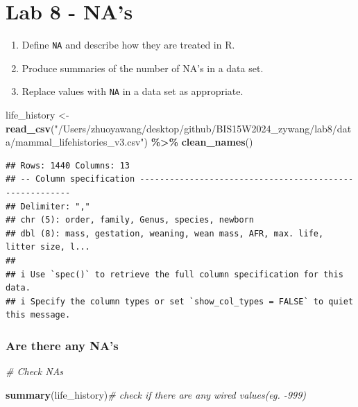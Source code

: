 \documentclass[
]{article}
\newenvironment{Shaded}{\begin{snugshade}}{\end{snugshade}}
\newcommand{\CommentTok}[1]{\textcolor[rgb]{0.56,0.35,0.01}{\textit{#1}}}
\newcommand{\FunctionTok}[1]{\textcolor[rgb]{0.13,0.29,0.53}{\textbf{#1}}}
\newcommand{\NormalTok}[1]{#1}
\newcommand{\OtherTok}[1]{\textcolor[rgb]{0.56,0.35,0.01}{#1}}
\newcommand{\SpecialCharTok}[1]{\textcolor[rgb]{0.81,0.36,0.00}{\textbf{#1}}}
\newcommand{\StringTok}[1]{\textcolor[rgb]{0.31,0.60,0.02}{#1}}
\providecommand{\tightlist}{%
  \setlength{\itemsep}{0pt}\setlength{\parskip}{0pt}}
\begin{document}
\hypertarget{lab-8---nas}{%
\section{Lab 8 - NA's}\label{lab-8---nas}}

\begin{enumerate}
\def\labelenumi{\arabic{enumi}.}
\tightlist
\item
  Define \texttt{NA} and describe how they are treated in R.\\
\item
  Produce summaries of the number of NA's in a data set.\\
\item
  Replace values with \texttt{NA} in a data set as appropriate.
\end{enumerate}

\begin{Shaded}
\begin{Highlighting}[]
\NormalTok{life\_history }\OtherTok{\textless{}{-}} \FunctionTok{read\_csv}\NormalTok{(}\StringTok{"/Users/zhuoyawang/desktop/github/BIS15W2024\_zywang/lab8/data/mammal\_lifehistories\_v3.csv"}\NormalTok{) }\SpecialCharTok{\%\textgreater{}\%} \FunctionTok{clean\_names}\NormalTok{()}
\end{Highlighting}
\end{Shaded}

\begin{verbatim}
## Rows: 1440 Columns: 13
## -- Column specification --------------------------------------------------------
## Delimiter: ","
## chr (5): order, family, Genus, species, newborn
## dbl (8): mass, gestation, weaning, wean mass, AFR, max. life, litter size, l...
## 
## i Use `spec()` to retrieve the full column specification for this data.
## i Specify the column types or set `show_col_types = FALSE` to quiet this message.
\end{verbatim}

\hypertarget{are-there-any-nas}{%
\subsubsection{Are there any NA's}\label{are-there-any-nas}}

\begin{Shaded}
\begin{Highlighting}[]
\CommentTok{\# Check NAs}

\FunctionTok{summary}\NormalTok{(life\_history)}\CommentTok{\# check if there are any wired values(eg. {-}999)}
\end{Highlighting}
\end{Shaded}
\end{document}
